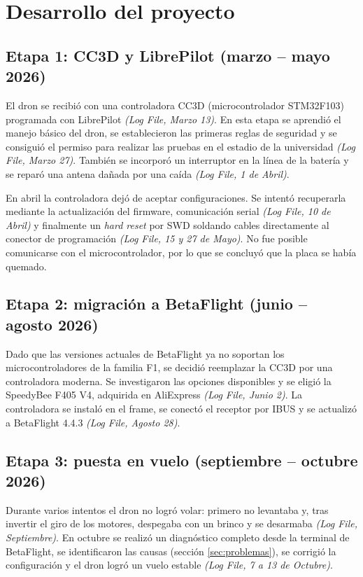 \documentclass[11pt,letterpaper]{article}
\newcommand{\logref}[1]{\textit{(Log File, #1)}}
\begin{document}
\section{Desarrollo del proyecto}
\subsection{Etapa 1: CC3D y LibrePilot (marzo -- mayo 2026)}
El dron se recibió con una controladora CC3D (microcontrolador STM32F103) programada con LibrePilot \logref{Marzo 13}. En esta etapa se aprendió el manejo básico del dron, se establecieron las primeras reglas de seguridad y se consiguió el permiso para realizar las pruebas en el estadio de la universidad \logref{Marzo 27}. También se incorporó un interruptor en la línea de la batería y se reparó una antena dañada por una caída \logref{1 de Abril}.

En abril la controladora dejó de aceptar configuraciones. Se intentó recuperarla mediante la actualización del firmware, comunicación serial \logref{10 de Abril} y finalmente un \textit{hard reset} por SWD soldando cables directamente al conector de programación \logref{15 y 27 de Mayo}. No fue posible comunicarse con el microcontrolador, por lo que se concluyó que la placa se había quemado.

\subsection{Etapa 2: migración a BetaFlight (junio -- agosto 2026)}
Dado que las versiones actuales de BetaFlight ya no soportan los microcontroladores de la familia F1, se decidió reemplazar la CC3D por una controladora moderna. Se investigaron las opciones disponibles y se eligió la SpeedyBee F405 V4, adquirida en AliExpress \logref{Junio 2}. La controladora se instaló en el frame, se conectó el receptor por IBUS y se actualizó a BetaFlight 4.4.3 \logref{Agosto 28}.

\subsection{Etapa 3: puesta en vuelo (septiembre -- octubre 2026)}
Durante varios intentos el dron no logró volar: primero no levantaba y, tras invertir el giro de los motores, despegaba con un brinco y se desarmaba \logref{Septiembre}. En octubre se realizó un diagnóstico completo desde la terminal de BetaFlight, se identificaron las causas (sección \ref{sec:problemas}), se corrigió la configuración y el dron logró un vuelo estable \logref{7 a 13 de Octubre}.
\end{document}
